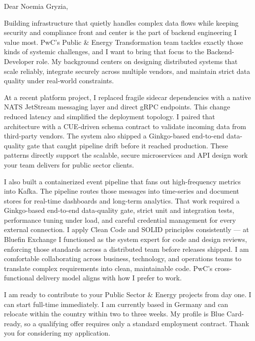 \documentclass[11pt,a4paper]{coverletter}
\begin{document}

\opening{Dear Noemia Gryzia,}

Building infrastructure that quietly handles complex data flows while keeping security and compliance front and center is the part of backend engineering I value most. PwC’s Public \& Energy Transformation team tackles exactly those kinds of systemic challenges, and I want to bring that focus to the Backend-Developer role. My background centers on designing distributed systems that scale reliably, integrate securely across multiple vendors, and maintain strict data quality under real-world constraints.

At a recent platform project, I replaced fragile sidecar dependencies with a native NATS JetStream messaging layer and direct gRPC endpoints. This change reduced latency and simplified the deployment topology. I paired that architecture with a CUE-driven schema contract to validate incoming data from third-party vendors. The system also shipped a Ginkgo-based end-to-end data-quality gate that caught pipeline drift before it reached production. These patterns directly support the scalable, secure microservices and API design work your team delivers for public sector clients.

I also built a containerized event pipeline that fans out high-frequency metrics into Kafka. The pipeline routes those messages into time-series and document stores for real-time dashboards and long-term analytics. That work required a Ginkgo-based end-to-end data-quality gate, strict unit and integration tests, performance tuning under load, and careful credential management for every external connection. I apply Clean Code and SOLID principles consistently — at Bluefin Exchange I functioned as the system expert for code and design reviews, enforcing those standards across a distributed team before releases shipped. I am comfortable collaborating across business, technology, and operations teams to translate complex requirements into clean, maintainable code. PwC’s cross-functional delivery model aligns with how I prefer to work.

I am ready to contribute to your Public Sector \& Energy projects from day one. I can start full-time immediately. I am currently based in Germany and can relocate within the country within two to three weeks. My profile is Blue Card-ready, so a qualifying offer requires only a standard employment contract. Thank you for considering my application.
\end{document}
